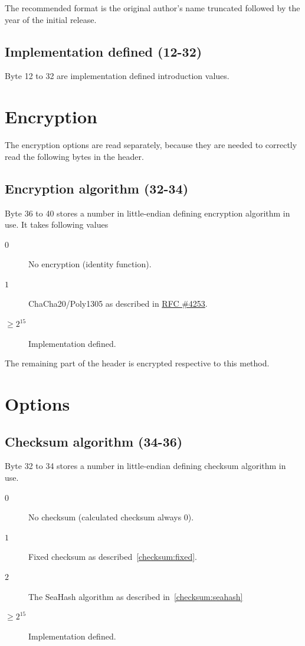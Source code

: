 \documentclass[11pt,a4paper]{report}
\begin{document}
        The recommended format is the original author's name truncated
        followed by the year of the initial release.

        \subsection{Implementation defined (12-32)}
        Byte 12 to 32 are implementation defined introduction values.

    \section{Encryption}
        The encryption options are read separately, because they are needed to
        correctly read the following bytes in the header.
        \subsection{Encryption algorithm (32-34)}
        \label{config:encryption}
        Byte 36 to 40 stores a number in little-endian defining encryption
        algorithm in use. It takes following values

        \begin{description}
            \item [$0$] No encryption (identity function).
            \item [$1$] ChaCha20/Poly1305 as described in
                \href{https://tools.ietf.org/html/rfc4253}{RFC \#4253}.
            \item [$\geq 2^{15}$] Implementation defined.
        \end{description}

        The remaining part of the header is encrypted respective to this
        method.

    \section{Options}
        \subsection{Checksum algorithm (34-36)}
        \label{config:checksum}
        Byte 32 to 34 stores a number in little-endian defining checksum
        algorithm in use.

        \begin{description}
            \item [$0$] No checksum (calculated checksum always 0).
            \item [$1$] Fixed checksum as described~\ref{checksum:fixed}.
            \item [$2$] The SeaHash algorithm
                as described
                in~\ref{checksum:seahash}
            \item [$\geq 2^{15}$] Implementation defined.
        \end{description}
\end{document}
